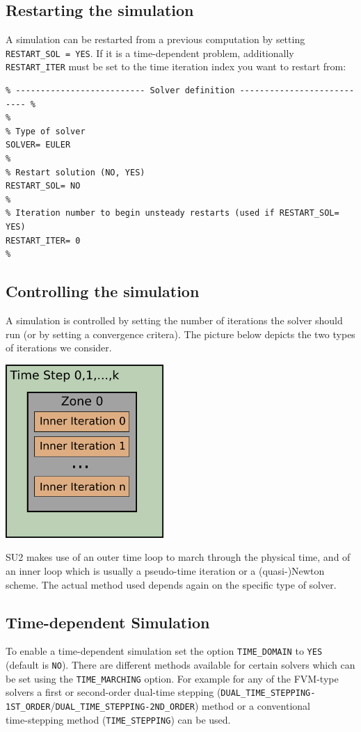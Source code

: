 \documentclass{article}
\begin{document}
\subsection{Restarting the simulation}
A simulation can be restarted from a previous computation by setting \verb|RESTART_SOL = YES|. If it is a time-dependent problem, additionally \verb|RESTART_ITER| must be set to the time iteration index you want to restart from: 

\begin{lstlisting}
% -------------------------- Solver definition --------------------------- %
%
% Type of solver 
SOLVER= EULER
%
% Restart solution (NO, YES)
RESTART_SOL= NO
%
% Iteration number to begin unsteady restarts (used if RESTART_SOL= YES)
RESTART_ITER= 0
%

\end{lstlisting}

\newpage
\subsection{Controlling the simulation}
A simulation is controlled by setting the number of iterations the solver should run (or by setting a convergence critera). The picture below depicts the two types of iterations we consider.

\begin{center}
    \includegraphics[width=6cm]{Figures/unst_singlezone.png}
\end{center}

SU2 makes use of an outer time loop to march through the physical time, and of an inner loop which is usually a pseudo-time iteration or a (quasi-)Newton scheme. The actual method used depends again on the specific type of solver.

\subsection{Time-dependent Simulation}
To enable a time-dependent simulation set the option \verb|TIME_DOMAIN| to \verb|YES| (default is \verb|NO|). There are different methods available for certain solvers which can be set using the \verb|TIME_MARCHING| option. For example for any of the FVM-type solvers a first or second-order dual-time stepping (\verb|DUAL_TIME_STEPPING-1ST_ORDER|/\verb|DUAL_TIME_STEPPING-2ND_ORDER|) method or a conventional \\time-stepping method (\verb|TIME_STEPPING|) can be used.
\end{document}
